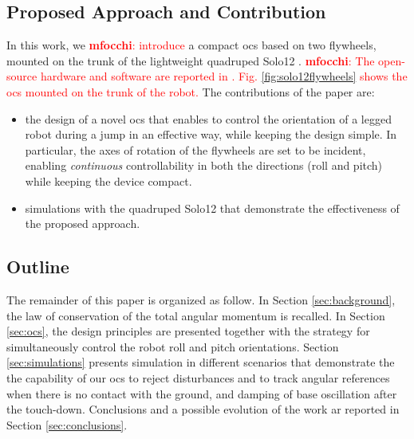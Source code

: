 \documentclass[sensors,article,submit,pdftex,moreauthors]{Definitions/mdpi}
\newcommand{\MF}[1]{\textcolor{red}{\textbf{mfocchi}: #1}}
\begin{document}
\subsection{Proposed Approach and Contribution}
In this work, we \MF{introduce} a compact \gls{ocs} based on two flywheels, mounted on the trunk of the lightweight quadruped Solo12 \cite{grimminger2020open}. \MF{The open-source hardware and software are reported in \cite{github_solo}. Fig. \ref{fig:solo12flywheels} shows the \gls{ocs} mounted on the trunk of the robot. }
The contributions of the paper are:
\begin{itemize}
	\item the design of a novel \gls{ocs} that enables to control the orientation of a legged robot during a jump in an effective way, while keeping the design simple. 
	In particular, the axes of rotation of the flywheels are set to be incident, enabling \textit{continuous} controllability in both the directions (roll and pitch) while keeping the device compact.
	\item simulations  with the quadruped Solo12 that demonstrate the effectiveness of the proposed approach.
\end{itemize}



\subsection{Outline}
The remainder of this paper is organized as follow. In Section \ref{sec:background}, the law of conservation of the total angular momentum is recalled. In Section \ref{sec:ocs}, the design principles are presented together with the strategy for simultaneously control the robot roll and pitch orientations. Section \ref{sec:simulations} presents simulation in different scenarios that demonstrate the the capability of our \gls{ocs} to reject disturbances and to track angular references when there is no contact with the ground, and damping of base oscillation after the touch-down. Conclusions and a possible evolution of the work ar reported in Section \ref{sec:conclusions}.
\end{document}
